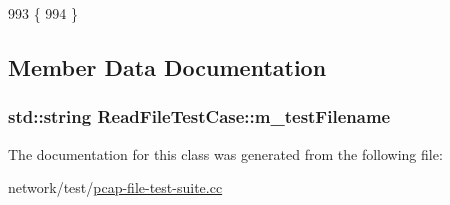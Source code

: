\begin{DoxyCode}
993 \{
994 \}
\end{DoxyCode}


\subsection{Member Data Documentation}
\subsubsection[{\texorpdfstring{m\+\_\+test\+Filename}{m_testFilename}}]{\setlength{\rightskip}{0pt plus 5cm}std\+::string Read\+File\+Test\+Case\+::m\+\_\+test\+Filename\hspace{0.3cm}{\ttfamily [private]}}\hypertarget{classReadFileTestCase_ab3ad8be390c1fd24831d2edeee29ffdb}{}\label{classReadFileTestCase_ab3ad8be390c1fd24831d2edeee29ffdb}


The documentation for this class was generated from the following file\+:\begin{DoxyCompactItemize}
\item 
network/test/\hyperlink{pcap-file-test-suite_8cc}{pcap-\/file-\/test-\/suite.\+cc}\end{DoxyCompactItemize}
